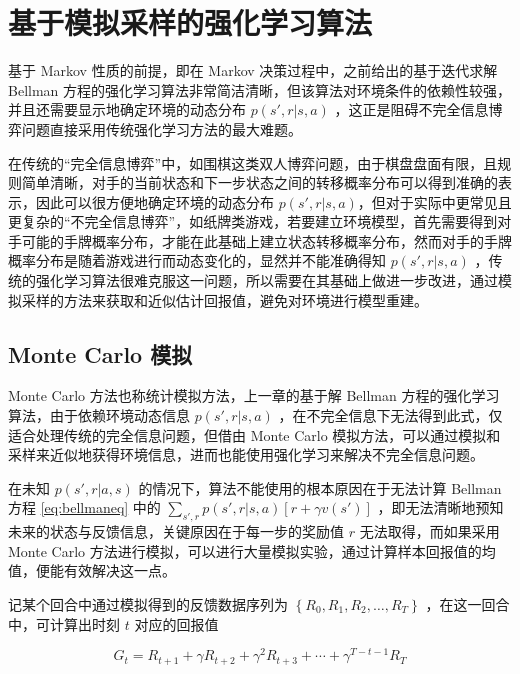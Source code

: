 
\chapter{基于模拟采样的强化学习算法}

基于 Markov 性质的前提，即在 Markov 决策过程中，之前给出的基于迭代求解 Bellman 方程的强化学习算法非常简洁清晰，但该算法对环境条件的依赖性较强，并且还需要显示地确定环境的动态分布 $p(s',r|s,a)$ ，这正是阻碍不完全信息博弈问题直接采用传统强化学习方法的最大难题。

在传统的“完全信息博弈”中，如围棋这类双人博弈问题，由于棋盘盘面有限，且规则简单清晰，对手的当前状态和下一步状态之间的转移概率分布可以得到准确的表示\cite{silver2017mastering}，因此可以很方便地确定环境的动态分布 $p(s',r|s,a)$，但对于实际中更常见且更复杂的“不完全信息博弈”，如纸牌类游戏，若要建立环境模型，首先需要得到对手可能的手牌概率分布，才能在此基础上建立状态转移概率分布，然而对手的手牌概率分布是随着游戏进行而动态变化的，显然并不能准确得知 $p(s',r|s,a)$ ，传统的强化学习算法很难克服这一问题\cite{sutton2018reinforcement}，所以需要在其基础上做进一步改进，通过模拟采样的方法来获取和近似估计回报值，避免对环境进行模型重建。

\section{Monte Carlo 模拟}

Monte Carlo 方法\cite{goodfellow2016deep}\cite{robert2013monte}也称统计模拟方法，上一章的基于解 Bellman 方程的强化学习算法，由于依赖环境动态信息 $p(s',r|s,a)$ ，在不完全信息下无法得到此式，仅适合处理传统的完全信息问题，但借由 Monte Carlo 模拟方法，可以通过模拟和采样来近似地获得环境信息，进而也能使用强化学习来解决不完全信息问题。

在未知 $p(s',r|a,s)$ 的情况下，算法不能使用的根本原因在于无法计算 Bellman 方程 \ref{eq:bellmaneq} 中的 $\sum_{s',r}p(s',r|s,a)[r+\gamma v(s')]$ ，即无法清晰地预知未来的状态与反馈信息，关键原因在于每一步的奖励值 $r$ 无法取得，而如果采用 Monte Carlo 方法进行模拟，可以进行大量模拟实验，通过计算样本回报值的均值，便能有效解决这一点。

记某个回合中通过模拟得到的反馈数据序列为 $\left\{R_0, R_1, R_2, \ldots, R_T\right\}$ ，在这一回合中，可计算出时刻 $t$ 对应的回报值

\begin{equation}
    G_t = R_{t+1} + \gamma R_{t+2} + \gamma^2 R_{t+3} + \cdots + \gamma^{T-t-1} R_T
\end{equation}

